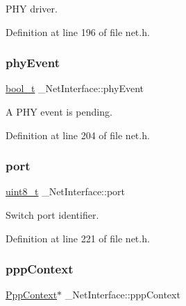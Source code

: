 P\+HY driver. 



Definition at line 196 of file net.\+h.

\mbox{\label{struct__NetInterface_a56b6ecff7a2d35f6f2dddf2d7c9b3a21}} 
\subsubsection{\texorpdfstring{phy\+Event}{phyEvent}}
{\footnotesize\ttfamily \hyperlink{compiler__port_8h_a812d16e5494522586b3784e55d479912}{bool\+\_\+t} \+\_\+\+Net\+Interface\+::phy\+Event}



A P\+HY event is pending. 



Definition at line 204 of file net.\+h.

\mbox{\label{struct__NetInterface_a12788702d431231f9a54d2e2935f1d00}} 
\subsubsection{\texorpdfstring{port}{port}}
{\footnotesize\ttfamily \hyperlink{stdint_8h_aba7bc1797add20fe3efdf37ced1182c5}{uint8\+\_\+t} \+\_\+\+Net\+Interface\+::port}



Switch port identifier. 



Definition at line 221 of file net.\+h.

\mbox{\label{struct__NetInterface_a26328f7253cfca2971eda92c763dd72b}} 
\subsubsection{\texorpdfstring{ppp\+Context}{pppContext}}
{\footnotesize\ttfamily \hyperlink{ppp_8h_a896c00dd8ba8bad09b3f442b7aa5ad9c}{Ppp\+Context}$\ast$ \+\_\+\+Net\+Interface\+::ppp\+Context}



